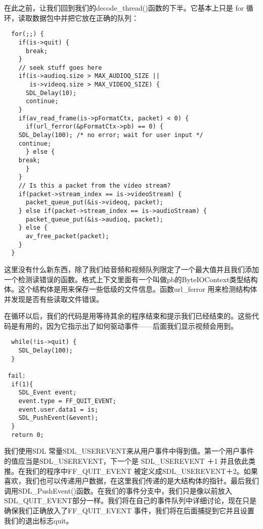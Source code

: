 在此之前，让我们回到我们的decode_thread()函数的下半。它基本上只是 for 循环，读取数据包中并把它放在正确的队列：
\begin{lstlisting}
  for(;;) {
    if(is->quit) {
      break;
    }
    // seek stuff goes here
    if(is->audioq.size > MAX_AUDIOQ_SIZE ||
       is->videoq.size > MAX_VIDEOQ_SIZE) {
      SDL_Delay(10);
      continue;
    }
    if(av_read_frame(is->pFormatCtx, packet) < 0) {
      if(url_ferror(&pFormatCtx->pb) == 0) {
    SDL_Delay(100); /* no error; wait for user input */
    continue;
      } else {
    break;
      }
    }
    // Is this a packet from the video stream?
    if(packet->stream_index == is->videoStream) {
      packet_queue_put(&is->videoq, packet);
    } else if(packet->stream_index == is->audioStream) {
      packet_queue_put(&is->audioq, packet);
    } else {
      av_free_packet(packet);
    }
  }
\end{lstlisting}

这里没有什么新东西，除了我们给音频和视频队列限定了一个最大值并且我们添加一个检测读错误的函数。格式上下文里面有一个叫做pb的ByteIOContext类型结构体。这个结构体是用来保存一些低级的文件信息。函数url_ferror 用来检测结构体并发现是否有些读取文件错误。

在循环以后，我们的代码是用等待其余的程序结束和提示我们已经结束的。这些代码是有用的，因为它指示出了如何驱动事件——后面我们显示视频会用到。
\begin{lstlisting}
  while(!is->quit) {
    SDL_Delay(100);
  }

 fail:
  if(1){
    SDL_Event event;
    event.type = FF_QUIT_EVENT;
    event.user.data1 = is;
    SDL_PushEvent(&event);
  }
  return 0;
\end{lstlisting}

我们使用SDL 常量SDL_USEREVENT来从用户事件中得到值。第一个用户事件的值应当是SDL_USEREVENT，下一个是 SDL_USEREVENT ＋1 并且依此类推。在我们的程序中FF_QUIT_EVENT 被定义成SDL_USEREVENT＋2。如果喜欢，我们也可以传递用户数据，在这里我们传递的是大结构体的指针。最后我们调用SDL_PushEvent()函数。在我们的事件分支中，我们只是像以前放入SDL_QUIT_EVENT部分一样。我们将在自己的事件队列中详细讨论，现在只是确保我们正确放入了FF_QUIT_EVENT 事件，我们将在后面捕捉到它并且设置我们的退出标志quit。

